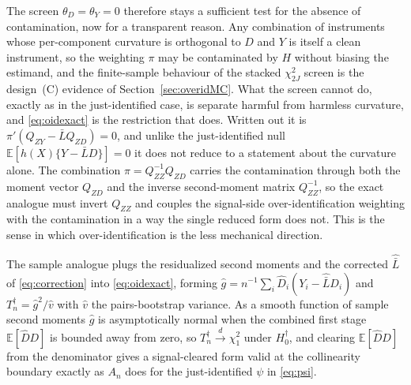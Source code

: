 \documentclass[preprint,11pt,authoryear]{elsarticle}
\theoremstyle{definition}
\newcommand{\E}{\mathbb{E}}
\newcommand{\convd}{\overset{d}{\longrightarrow}}
\begin{document}
The screen $\theta_D=\theta_Y=0$ therefore stays a sufficient test for the absence
of contamination, now for a transparent reason. Any combination of instruments whose
per-component curvature is orthogonal to $D$ and $Y$ is itself a clean instrument, so the
weighting $\pi$ may be contaminated by $H$ without biasing the estimand, and the
finite-sample behaviour of the stacked $\chi^2_{2J}$ screen is the design~(C) evidence of
Section~\ref{sec:overidMC}. What the screen cannot do, exactly as in the just-identified
case, is separate harmful from harmless curvature, and \eqref{eq:oidexact} is the
restriction that does. Written out it is $\pi'(Q_{ZY}-\bar L Q_{ZD})=0$, and unlike the
just-identified null $\E[h(X)\{Y-\bar L D\}]=0$ it does not reduce to a statement about the
curvature alone. The combination $\pi=Q_{ZZ}^{-1}Q_{ZD}$ carries the contamination through
both the moment vector $Q_{ZD}$ and the inverse second-moment matrix $Q_{ZZ}^{-1}$, so the
exact analogue must invert $Q_{ZZ}$ and couples the signal-side over-identification
weighting with the contamination in a way the single reduced form does not. This is the
sense in which over-identification is the less mechanical direction.

The sample analogue plugs the residualized second moments and the corrected
$\hat{\bar L}$ of \eqref{eq:correction} into \eqref{eq:oidexact}, forming
$\hat g=n^{-1}\sum_i\hat D_i(Y_i-\hat{\bar L}D_i)$ and $T_n^{\dagger}=\hat g^2/\hat v$ with
$\hat v$ the pairs-bootstrap variance. As a smooth function of sample second moments
$\hat g$ is asymptotically normal when the combined first stage $\E[\hat D D]$ is bounded
away from zero, so $T_n^{\dagger}\convd\chi^2_1$ under $H_0^{\dagger}$, and clearing
$\E[\hat D D]$ from the denominator gives a signal-cleared form valid at the collinearity
boundary exactly as $A_n$ does for the just-identified $\psi$ in \eqref{eq:psi}.
\end{document}
